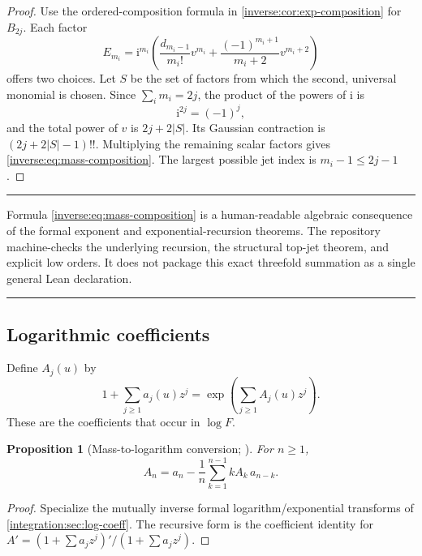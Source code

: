 \documentclass[11pt,oneside]{article}
\newtheorem{proposition}[proposition]{Proposition}
\theoremstyle{definition}
\theoremstyle{remark}
\newcommand{\ii}{\mathrm i}
\newenvironment{boxedremark}{%
  \par\smallskip\noindent\begin{center}\begin{minipage}{0.94\textwidth}%
  \color{black}\hrule\vspace{0.6em}\small
}{%
  \vspace{0.6em}\hrule\end{minipage}\end{center}\smallskip
}
\begin{document}
\begin{proof}
Use the ordered-composition formula in
\cref{inverse:cor:exp-composition} for $B_{2j}$.  Each factor
\[
 E_{m_i}
 =\ii^{m_i}\left(
   \frac{d_{m_i-1}}{m_i!}v^{m_i}
   +\frac{(-1)^{m_i+1}}{m_i+2}v^{m_i+2}
 \right)
\]
offers two choices.  Let $S$ be the set of factors from which the second,
universal monomial is chosen.  Since $\sum_i m_i=2j$, the product of the
powers of $\ii$ is
\[
 \ii^{2j}=(-1)^j,
\]
and the total power of $v$ is $2j+2|S|$.  Its Gaussian contraction is
$(2j+2|S|-1)!!$.  Multiplying the remaining scalar factors gives
\eqref{inverse:eq:mass-composition}.  The largest possible jet index is
$m_i-1\leq2j-1$.
\end{proof}

\begin{boxedremark}
Formula \eqref{inverse:eq:mass-composition} is a human-readable algebraic
consequence of the formal exponent and exponential-recursion theorems.
The repository machine-checks the underlying recursion, the structural
top-jet theorem, and explicit low orders.  It does not package this exact
threefold summation as a single general Lean declaration.
\end{boxedremark}

\subsection{Logarithmic coefficients}

Define $A_j(u)$ by
\begin{equation}
 1+\sum_{j\geq1}a_j(u)z^j
 =\exp\!\left(\sum_{j\geq1}A_j(u)z^j\right).
 \label{inverse:eq:log-coeff-definition}
\end{equation}
These are the coefficients that occur in $\log F$.

\begin{proposition}[Mass-to-logarithm conversion; \Formalized]
\label{inverse:prop:log-recursion}
For $n\geq1$,
\begin{equation}
 A_n
 =a_n-\frac1n\sum_{k=1}^{n-1}kA_k\,a_{n-k}.
 \label{inverse:eq:A-recursion}
\end{equation}
\end{proposition}

\begin{proof}
Specialize the mutually inverse formal logarithm/exponential transforms of
\cref{integration:sec:log-coeff}.  The recursive form is the coefficient identity for
\(A'=(1+\sum a_jz^j)'/(1+\sum a_jz^j)\).
\end{proof}
\end{document}
